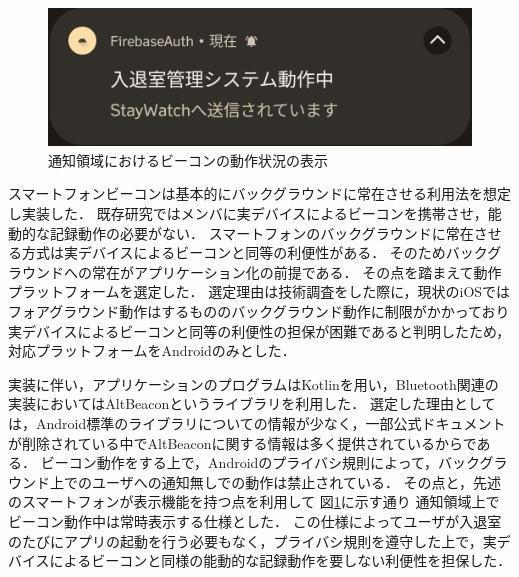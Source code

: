 \begin{figure}[tbh]
  \centering
  \includegraphics[width=12cm]{image/AppNofication.png}
  \caption{通知領域におけるビーコンの動作状況の表示}
  \label{fig:AppNofication}
\end{figure}


スマートフォンビーコンは基本的にバックグラウンドに常在させる利用法を想定し実装した．
既存研究ではメンバに実デバイスによるビーコンを携帯させ，能動的な記録動作の必要がない．
スマートフォンのバックグラウンドに常在させる方式は実デバイスによるビーコンと同等の利便性がある．
そのためバックグラウンドへの常在がアプリケーション化の前提である．
その点を踏まえて動作プラットフォームを選定した．
選定理由は技術調査をした際に，現状のiOSではフォアグラウンド動作はするもののバックグラウンド動作に制限がかかっており実デバイスによるビーコンと同等の利便性の担保が困難であると判明したため，対応プラットフォームをAndroidのみとした．

実装に伴い，アプリケーションのプログラムはKotlinを用い，Bluetooth関連の実装においてはAltBeaconというライブラリを利用した．
選定した理由としては，Android標準のライブラリについての情報が少なく，一部公式ドキュメントが削除されている中でAltBeaconに関する情報は多く提供されているからである．
ビーコン動作をする上で，Androidのプライバシ規則によって，バックグラウンド上でのユーザへの通知無しでの動作は禁止されている．
その点と，先述のスマートフォンが表示機能を持つ点を利用して 図\ref{fig:AppNofication}に示す通り   通知領域上でビーコン動作中は常時表示する仕様とした．
この仕様によってユーザが入退室のたびにアプリの起動を行う必要もなく，プライバシ規則を遵守した上で，実デバイスによるビーコンと同様の能動的な記録動作を要しない利便性を担保した．

